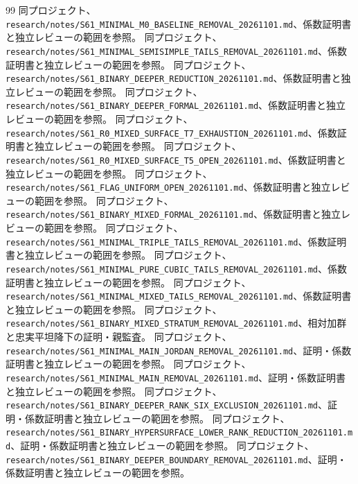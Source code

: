 \documentclass[11pt,a4paper]{ltjsarticle}
\theoremstyle{remark}
\begin{document}
\begin{thebibliography}{99}
 同プロジェクト、\nolinkurl{research/notes/S61_MINIMAL_M0_BASELINE_REMOVAL_20261101.md}、係数証明書と独立レビューの範囲を参照。
 同プロジェクト、\nolinkurl{research/notes/S61_MINIMAL_SEMISIMPLE_TAILS_REMOVAL_20261101.md}、係数証明書と独立レビューの範囲を参照。
 同プロジェクト、\nolinkurl{research/notes/S61_BINARY_DEEPER_REDUCTION_20261101.md}、係数証明書と独立レビューの範囲を参照。
 同プロジェクト、\nolinkurl{research/notes/S61_BINARY_DEEPER_FORMAL_20261101.md}、係数証明書と独立レビューの範囲を参照。
 同プロジェクト、\nolinkurl{research/notes/S61_R0_MIXED_SURFACE_T7_EXHAUSTION_20261101.md}、係数証明書と独立レビューの範囲を参照。
 同プロジェクト、\nolinkurl{research/notes/S61_R0_MIXED_SURFACE_T5_OPEN_20261101.md}、係数証明書と独立レビューの範囲を参照。
 同プロジェクト、\nolinkurl{research/notes/S61_FLAG_UNIFORM_OPEN_20261101.md}、係数証明書と独立レビューの範囲を参照。
 同プロジェクト、\nolinkurl{research/notes/S61_BINARY_MIXED_FORMAL_20261101.md}、係数証明書と独立レビューの範囲を参照。
 同プロジェクト、\nolinkurl{research/notes/S61_MINIMAL_TRIPLE_TAILS_REMOVAL_20261101.md}、係数証明書と独立レビューの範囲を参照。
 同プロジェクト、\nolinkurl{research/notes/S61_MINIMAL_PURE_CUBIC_TAILS_REMOVAL_20261101.md}、係数証明書と独立レビューの範囲を参照。
 同プロジェクト、\nolinkurl{research/notes/S61_MINIMAL_MIXED_TAILS_REMOVAL_20261101.md}、係数証明書と独立レビューの範囲を参照。
 同プロジェクト、\nolinkurl{research/notes/S61_BINARY_MIXED_STRATUM_REMOVAL_20261101.md}、相対加群と忠実平坦降下の証明・親監査。
 同プロジェクト、\nolinkurl{research/notes/S61_MINIMAL_MAIN_JORDAN_REMOVAL_20261101.md}、証明・係数証明書と独立レビューの範囲を参照。
 同プロジェクト、\nolinkurl{research/notes/S61_MINIMAL_MAIN_REMOVAL_20261101.md}、証明・係数証明書と独立レビューの範囲を参照。
 同プロジェクト、\nolinkurl{research/notes/S61_BINARY_DEEPER_RANK_SIX_EXCLUSION_20261101.md}、証明・係数証明書と独立レビューの範囲を参照。
 同プロジェクト、\nolinkurl{research/notes/S61_BINARY_HYPERSURFACE_LOWER_RANK_REDUCTION_20261101.md}、証明・係数証明書と独立レビューの範囲を参照。
 同プロジェクト、\nolinkurl{research/notes/S61_BINARY_DEEPER_BOUNDARY_REMOVAL_20261101.md}、証明・係数証明書と独立レビューの範囲を参照。

\end{thebibliography}
\end{document}
